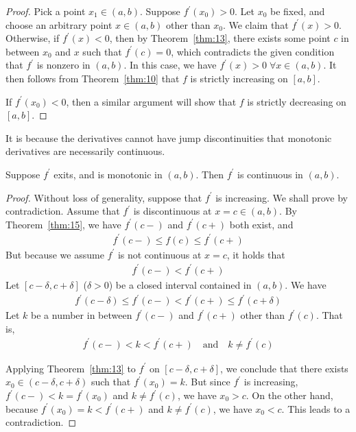\documentclass[thmcnt=section, 12pt]{my-elegantbook}
\begin{document}
\begin{proof}
    Pick a point $x_1 \in (a, b)$. Suppose $f^\prime(x_0) > 0$. Let $x_0$ be fixed, and choose an arbitrary point $x \in (a, b)$ other than $x_0$. We claim that $f^\prime(x) > 0$. Otherwise, if $f^\prime(x) < 0$, then by Theorem~\ref{thm:13}, there exists some point $c$ in between $x_0$ and $x$ such that $f^\prime(c) = 0$, which contradicts the given condition that $f^\prime$ is nonzero in $(a, b)$. In this case, we have $f^\prime(x) > 0 \; \forall x \in (a, b)$. It then follows from Theorem~\ref{thm:10} that $f$ is strictly increasing on $[a, b]$.

    \par If $f^\prime(x_0) < 0$, then a similar argument will show that $f$ is strictly decreasing on $[a, b]$.
\end{proof}


\par It is because the derivatives cannot have jump discontinuities that monotonic derivatives are necessarily continuous.

\begin{theorem}
    Suppose $f^\prime$ exits, and is monotonic in $(a, b)$. Then $f^\prime$ is continuous in $(a, b)$.
\end{theorem}

\begin{proof}
    Without loss of generality, suppose that $f^\prime$ is increasing. We shall prove by contradiction. Assume that $f^\prime$ is discontinuous at $x = c \in (a, b)$. By Theorem~\ref{thm:15}, we have $f^\prime(c-)$ and $f^\prime(c+)$ both exist, and 
    \begin{align*}
        f^\prime(c-) \leq f(c) \leq f^\prime(c+)
    \end{align*}
    But because we assume $f^\prime$ is not continuous at $x = c$, it holds that 
    \begin{align*}
        f^\prime(c-) < f^\prime(c+)
    \end{align*}
    Let $[c-\delta, c+\delta]$ ($\delta > 0$) be a closed interval contained in $(a, b)$. We have 
    \begin{align*}
        f^\prime(c-\delta) \leq f^\prime(c-) < f^\prime(c+) \leq f^\prime(c+\delta)
    \end{align*}
    Let $k$ be a number in between $f^\prime(c-)$ and $ f^\prime(c+)$ other than $f^\prime(c)$. That is, 
    \begin{align*}
        f^\prime(c-) < k < f^\prime(c+) 
        \quad \text{and} \quad 
        k \neq f^\prime(c)
    \end{align*}
    
    \par Applying Theorem~\ref{thm:13} to $f^\prime$ on $[c-\delta, c+\delta]$, we conclude that there exists $x_0 \in (c-\delta, c+\delta)$ such that $f^\prime(x_0) = k$. But since $f^\prime$ is increasing, $f^\prime(c-) < k = f^\prime(x_0)$ and $k \neq f^\prime(c)$, we have $x_0 > c$. On the other hand, because $ f^\prime(x_0) = k < f^\prime(c+) $ and $k \neq f^\prime(c)$, we have $x_0 < c$. This leads to a contradiction. 
\end{proof}
\end{document}
